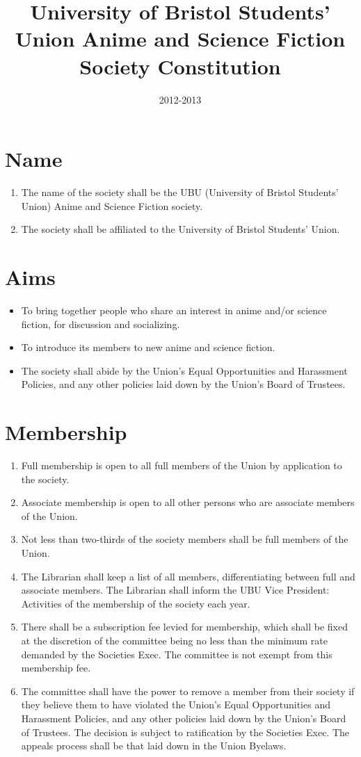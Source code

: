 \documentclass[a4paper,10pt]{article}
\title{University of Bristol Students' Union Anime and Science Fiction Society Constitution}
\author{}
\date{2012-2013}
\begin{document}
\maketitle

\pagebreak
\section{Name}
\begin{enumerate}
  \item The name of the society shall be the UBU (University of Bristol Students' Union) Anime and Science Fiction society.
  \item The society shall be affiliated to the University of Bristol Students' Union.
\end{enumerate}

\section{Aims}
\begin{itemize}
  \item To bring together people who share an interest in anime and/or science fiction, for discussion and socializing.
  \item To introduce its members to new anime and science fiction.
  \item The society shall abide by the Union's Equal Opportunities and Harassment Policies, and any other policies laid down by the Union's Board of Trustees.
\end{itemize}


\section{Membership}
\begin{enumerate}
  \item Full membership is open to all full members of the Union by application to the society.
  \item Associate membership is open to all other persons who are associate members of the Union.
  \item Not less than two-thirds of the society members shall be full members of the Union.
  \item The Librarian shall keep a list of all members, differentiating between full and associate members. The Librarian shall inform the UBU Vice President: Activities of the membership of the society each year.
  \item There shall be a subscription fee levied for membership, which shall be fixed at the discretion of the committee being no less than the minimum rate demanded by the Societies Exec. The committee is not exempt from this membership fee.
  \item The committee shall have the power to remove a member from their society if they believe them to have violated the Union's Equal Opportunities and Harassment Policies, and any other policies laid down by the Union's Board of Trustees. The decision is subject to ratification by the Societies Exec. The appeals process shall be that laid down in the Union Byelaws.
\end{enumerate}
\end{document}
